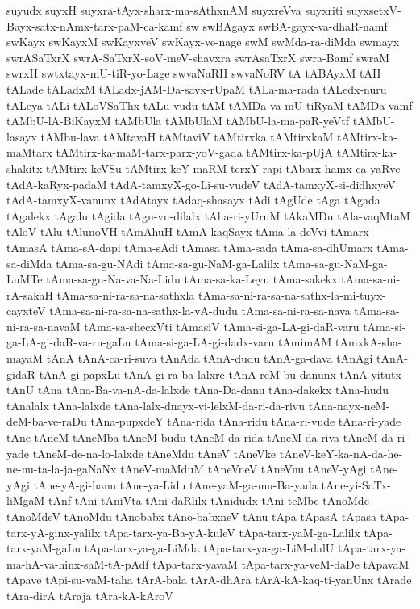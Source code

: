 {suyudx
suyxH
suyxra-tAyx-sharx-ma-sAthxnAM
suyxreVva
suyxriti
suyxsetxV-Bayx-satx-nAmx-tarx-paM-ca-kamf
sw
swBAgayx
swBA-gayx-va-dhaR-namf
swKayx
swKayxM
swKayxveV
swKayx-ve-nage
swM
swMda-ra-diMda
swmayx
swrASaTxrX
swrA-SaTxrX-soV-meV-shavxra
swrAsaTxrX
swra-Bamf
swraM
swrxH
swtxtayx-mU-tiR-yo-Lage
swvaNaRH
swvaNoRV
tA
tABAyxM
tAH
tALade
tALadxM
tALadx-jAM-Da-savx-rUpaM
tALa-ma-rada
tALedx-nuru
tALeya
tALi
tALoVSaThx
tALu-vudu
tAM
tAMDa-va-mU-tiRyaM
tAMDa-vamf
tAMbU-lA-BiKayxM
tAMbUla
tAMbUlaM
tAMbU-la-ma-paR-yeVtf
tAMbU-lasayx
tAMbu-lava
tAMtavaH
tAMtaviV
tAMtirxka
tAMtirxkaM
tAMtirx-ka-maMtarx
tAMtirx-ka-maM-tarx-parx-yoV-gada
tAMtirx-ka-pUjA
tAMtirx-ka-shakitx
tAMtirx-keVSu
tAMtirx-keY-maRM-terxY-rapi
tAbarx-hamx-ca-yaRve
tAdA-kaRyx-padaM
tAdA-tamxyX-go-Li-su-vudeV
tAdA-tamxyX-si-didhxyeV
tAdA-tamxyX-vanunx
tAdAtayx
tAdaq-shasayx
tAdi
tAgUde
tAga
tAgada
tAgalekx
tAgalu
tAgida
tAgu-vu-dilalx
tAha-ri-yUruM
tAkaMDu
tAla-vaqMtaM
tAloV
tAlu
tAlunoVH
tAmAhuH
tAmA-kaqSayx
tAma-la-deVvi
tAmarx
tAmasA
tAma-sA-dapi
tAma-sAdi
tAmasa
tAma-sada
tAma-sa-dhUmarx
tAma-sa-diMda
tAma-sa-gu-NAdi
tAma-sa-gu-NaM-ga-Lalilx
tAma-sa-gu-NaM-ga-LuMTe
tAma-sa-gu-Na-va-Na-Lidu
tAma-sa-ka-Leyu
tAma-sakekx
tAma-sa-ni-rA-sakaH
tAma-sa-ni-ra-sa-na-sathxla
tAma-sa-ni-ra-sa-na-sathx-la-mi-tuyx-cayxteV
tAma-sa-ni-ra-sa-na-sathx-la-vA-dudu
tAma-sa-ni-ra-sa-nava
tAma-sa-ni-ra-sa-navaM
tAma-sa-shecxVti
tAmasiV
tAma-si-ga-LA-gi-daR-varu
tAma-si-ga-LA-gi-daR-va-ru-gaLu
tAma-si-ga-LA-gi-dadx-varu
tAmimAM
tAmxkA-sha-mayaM
tAnA
tAnA-ca-ri-suva
tAnAda
tAnA-dudu
tAnA-ga-dava
tAnAgi
tAnA-gidaR
tAnA-gi-papxLu
tAnA-gi-ra-ba-lalxre
tAnA-reM-bu-danunx
tAnA-yitutx
tAnU
tAna
tAna-Ba-va-nA-da-lalxde
tAna-Da-danu
tAna-dakekx
tAna-hudu
tAnalalx
tAna-lalxde
tAna-lalx-dnayx-vi-lelxM-da-ri-da-rivu
tAna-nayx-neM-deM-ba-ve-raDu
tAna-pupxdeY
tAna-rida
tAna-ridu
tAna-ri-vude
tAna-ri-yade
tAne
tAneM
tAneMba
tAneM-budu
tAneM-da-rida
tAneM-da-riva
tAneM-da-ri-yade
tAneM-de-na-lo-lalxde
tAneMdu
tAneV
tAneVke
tAneV-keY-ka-nA-da-he-ne-nu-ta-la-ja-gaNaNx
tAneV-maMduM
tAneVneV
tAneVnu
tAneV-yAgi
tAne-yAgi
tAne-yA-gi-hanu
tAne-ya-Lidu
tAne-yaM-ga-mu-Ba-yada
tAne-yi-SaTx-liMgaM
tAnf
tAni
tAniVta
tAni-daRlilx
tAnidudx
tAni-teMbe
tAnoMde
tAnoMdeV
tAnoMdu
tAnobabx
tAno-babxneV
tAnu
tApa
tApasA
tApasa
tApa-tarx-yA-ginx-yalilx
tApa-tarx-ya-Ba-yA-kuleV
tApa-tarx-yaM-ga-Lalilx
tApa-tarx-yaM-gaLu
tApa-tarx-ya-ga-LiMda
tApa-tarx-ya-ga-LiM-dalU
tApa-tarx-ya-ma-hA-va-hinx-saM-tA-pAdf
tApa-tarx-yavaM
tApa-tarx-ya-veM-daDe
tApavaM
tApave
tApi-su-vaM-taha
tArA-bala
tArA-dhAra
tArA-kA-kaq-ti-yanUnx
tArade
tAra-dirA
tAraja
tAra-kA-kAroV
}
